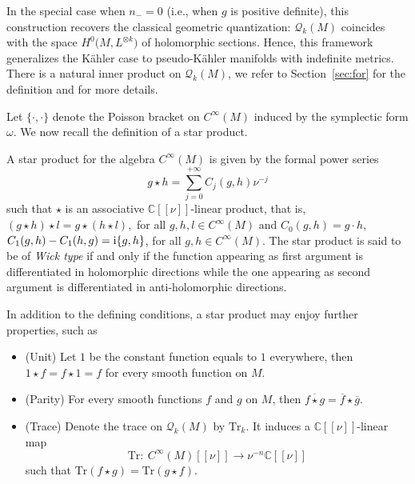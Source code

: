 \documentclass[10pt,a4paper]{amsart}
\numberwithin{equation}{section}
\begin{document}
		In the special case when $n_- = 0$ (i.e., when $g$ is positive definite), this construction recovers the classical geometric quantization: $\mathcal{Q}_k(M)$ coincides with the space $H^0\bigl(M, L^{\otimes k}\bigr)$ of holomorphic sections. Hence, this framework generalizes the K\"ahler case to pseudo-K\"ahler manifolds with indefinite metrics. There is a natural inner product on $\mathcal{Q}_k(M)$, we refer to Section~\ref{sec:for} for the definition and for more details.
		
		Let $\{\cdot ,\cdot\}$ denote the Poisson bracket on $C^\infty(M)$ induced by the symplectic form $\omega$.
		We now recall the definition of a star product.
	
	\begin{Definition} \label{def:star}
		A star product for the algebra $C^{\infty}(M)$ is given by the formal power series
		\[g\star h= \sum_{j=0}^{+\infty} C_{j}(g,h) \nu^{-j} \]
		such that $\star$ is an associative $\mathbb C[[\nu]]$-linear product, that is, $(g\star h) \star l=g\star (h\star l) ,$ for all $g, h, l\in C^{\infty}(M)$ and $C_{0}(g,h)=g\cdot h $, $ C_{1}(g,h)-C_{1}(h,g)= {\rm i} \{g, h\} $, for all $g, h\in C^{\infty}(M)$. The star product is said to be of \textit{Wick type} if and only if the function appearing as first argument is differentiated in holomorphic directions while the one appearing as second argument is differentiated in anti-holomorphic directions.
		
		In addition to the defining conditions, a star product may enjoy further properties, such as
		\begin{itemize}\itemsep=0pt
			\item[(1)] (Unit) Let $1$ be the constant function equals to $1$ everywhere, then $1\star f= f\star 1 =f$ for every smooth function on $M$.
			\item[(2)] (Parity) For every smooth functions $f$ and $g$ on $M$, then $\overline{f\star g}=\overline{f}\star \overline{g}$.
			\item[(3)] (Trace) Denote the trace on $\mathcal{Q}_k(M)$ by $\mathrm{Tr}_k$. It induces a $\mathbb{C}[[\nu]]$-linear map
			\[\mathrm{Tr} \colon\ {C}^{\infty}(M)[[\nu]]\rightarrow \nu^{-n} \mathbb{C}[[\nu]]\]
			such that
			$\mathrm{Tr}(f\star g)=\mathrm{Tr}(g\star f)$.
		\end{itemize}
\end{Definition}
	
\end{document}
